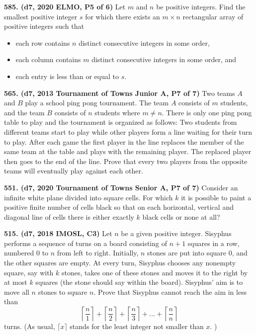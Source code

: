 \documentclass{article}
\begin{document}
\textbf{585. (\color{red}d7\color{black}, 2020 ELMO, P5 of 6)} Let $m$ and $n$ be positive integers. Find the smallest positive integer $s$ for which there exists an $m \times n$ rectangular array of positive integers such that
\begin{itemize}
        \item each row contains $n$ distinct consecutive integers in some order,
        \item each column contains $m$ distinct consecutive integers in some order, and
        \item each entry is less than or equal to $s$.
\end{itemize}

\textbf{565. (\color{red}d7\color{black}, 2013 Tournament of Towns Junior A, P7 of 7)} Two teams $A$ and $B$ play a school ping pong tournament. The team $A$ consists of $m$ students, and the team $B$ consists of $n$ students where $m \ne n$.
There is only one ping pong table to play and the tournament is organized as follows: Two students from different teams start to play while other players form a line waiting for their turn to play. After each game the first player in the line replaces the member of the same team at the table and plays with the remaining player. The replaced player then goes to the end of the line.
Prove that every two players from the opposite teams will eventually play against each other.

\textbf{551. (\color{red}d7\color{black}, 2020 Tournament of Towns Senior A, P7 of 7)} Consider an infinite white plane divided into square cells. For which $k$ it is possible to paint a positive finite number of cells black so that on each horizontal, vertical and diagonal line of cells there is either exactly $k$ black cells or none at all?

\textbf{515. (\color{red}d7\color{black}, 2018 IMOSL, C3)} Let $n$ be a given positive integer. Sisyphus performs a sequence of turns on a board consisting of $n + 1$ squares in a row, numbered $0$ to $n$ from left to right. Initially, $n$ stones are put into square $0$, and the other squares are empty. At every turn, Sisyphus chooses any nonempty square, say with $k$ stones, takes one of these stones and moves it to the right by at most $k$ squares (the stone should say within the board). Sisyphus' aim is to move all $n$ stones to square $n$.
\smallbreak
Prove that Sisyphus cannot reach the aim in less than
\[ \left \lceil \frac{n}{1} \right \rceil + \left \lceil \frac{n}{2} \right \rceil + \left \lceil \frac{n}{3} \right \rceil + \dots + \left \lceil \frac{n}{n} \right \rceil \]turns. (As usual, $\lceil x \rceil$ stands for the least integer not smaller than $x$. )
\end{document}
